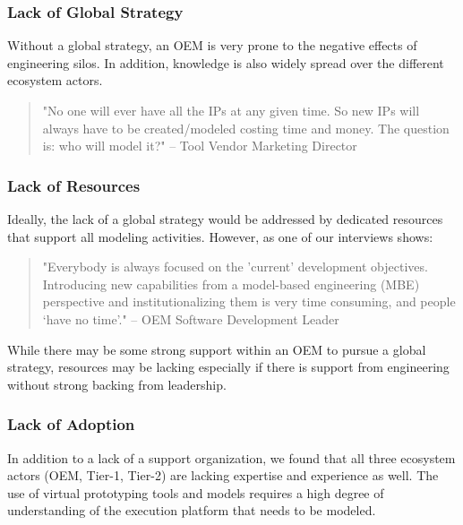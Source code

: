 \subsubsection*{Lack of Global Strategy }
Without a global strategy, an OEM is very prone to the negative effects of engineering silos.
In addition, knowledge is also widely spread over the different ecosystem actors.

\begin{quote}
"No one will ever have all the IPs at any given time. So new IPs will always have to be created/modeled costing time and money. The question is: who will model it?"
-- Tool Vendor Marketing Director
\end{quote}

\subsubsection*{Lack of Resources }
Ideally, the lack of a global strategy would be addressed by dedicated resources that support all modeling activities.
However, as one of our interviews shows:

\begin{quote}
"Everybody is always focused on the 'current' development objectives. Introducing new capabilities from a model-based engineering (MBE) perspective and institutionalizing them is very time consuming, and people ‘have no time’." 
-- OEM Software Development Leader
\end{quote}

While there may be some strong support within an OEM to pursue a global strategy, resources may be lacking especially if there is support from engineering without strong backing from leadership.

\subsubsection*{Lack of Adoption}
In addition to a lack of a support organization,
we found that all three ecosystem actors (OEM, Tier-1, Tier-2) are lacking expertise and experience as well.
The use of virtual prototyping tools and models requires a high degree of understanding of the execution platform that needs to be modeled.


